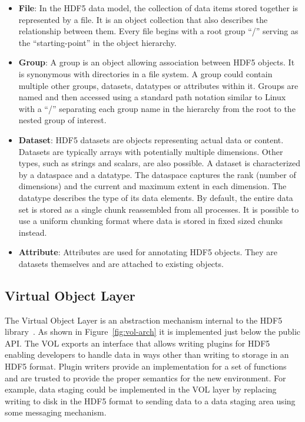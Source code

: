 \documentclass[conference]{IEEEtran} \pdfpagewidth=8.5in
\begin{document}
\begin{itemize}

\item
  \textbf{File}: In the HDF5 data model, the collection of data items stored
  together is represented by a file. It is an object collection that also
  describes the relationship between them. Every file begins with a root
  group ``/'' serving as the ``starting-point'' in the object hierarchy.

\item
  \textbf{Group}: A group is an object allowing association between HDF5
  objects. It is synonymous with directories in a file system. A group
  could contain multiple other groups, datasets, datatypes or attributes within
  it. Groups are named and then accessed using a standard path notation
  similar to Linux with a ``/'' separating each group name in the hierarchy
  from the root to the nested group of interest.

\item
  \textbf{Dataset}: HDF5 datasets are objects representing actual data
  or content. Datasets are typically arrays with potentially multiple
  dimensions. Other types, such as strings and scalars, are also possible. A
  dataset is characterized by a dataspace and a datatype. The dataspace
  captures the rank (number of dimensions) and the current and maximum
  extent in each dimension. The datatype describes the type of its data
  elements. By default, the entire data set is stored as a single chunk
  reassembled from all processes. It is possible to use a uniform chunking
  format where data is stored in fixed sized chunks instead.

\item
  \textbf{Attribute}: Attributes are used for annotating HDF5 objects. They are
  datasets themselves and are attached to existing objects.

\end{itemize}

\subsection{Virtual Object Layer}
\label{virtual-object-layer}

The Virtual Object Layer is an abstraction mechanism internal to the HDF5
library~\cite{hdf5}. As shown in Figure~\ref{fig:vol-arch} it is implemented
just below the public API. The VOL exports an interface that allows writing
plugins for HDF5 enabling developers to handle data in ways other than writing
to storage in an HDF5 format.  Plugin writers provide an implementation for a
set of functions and are trusted to provide the proper semantics for the new
environment. For example, data staging could be implemented in the VOL layer by
replacing writing to disk in the HDF5 format to sending data to a data staging
area using some messaging mechanism.
\end{document}
